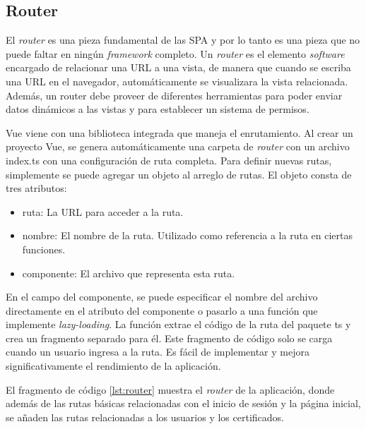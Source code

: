 \subsection{Router}
El \textit{router} es una pieza fundamental de las SPA y por lo tanto es una pieza que no puede faltar en ningún \textit{framework} completo. Un \textit{router} es el elemento \textit{software} encargado de relacionar una URL a una vista, de manera que cuando se escriba una URL en el navegador, automáticamente se visualizara la vista relacionada. Además, un router debe proveer de diferentes herramientas para poder enviar datos dinámicos a las vistas y para establecer un sistema de permisos.

Vue viene con una biblioteca integrada que maneja el enrutamiento. Al crear un proyecto Vue, se genera automáticamente una carpeta de \textit{router} con un archivo index.ts con una configuración de ruta completa. Para definir nuevas rutas, simplemente se puede agregar un objeto al arreglo de rutas. El objeto consta de tres atributos:

\begin{itemize}
\item ruta: La URL para acceder a la ruta.
\item nombre: El nombre de la ruta. Utilizado como referencia a la ruta en ciertas funciones.
\item componente: El archivo que representa esta ruta.
\end{itemize}

En el campo del componente, se puede especificar el nombre del archivo directamente en el atributo del componente o pasarlo a una función que implemente \textit{lazy-loading}. La función extrae el código de la ruta del paquete ts y crea un fragmento separado para él. Este fragmento de código solo se carga cuando un usuario ingresa a la ruta. Es fácil de implementar y mejora significativamente el rendimiento de la aplicación.

El fragmento de código \ref{lst:router} muestra el \textit{router} de la aplicación, donde además de las rutas básicas relacionadas con el inicio de sesión y la página inicial, se añaden las rutas relacionadas a los usuarios y los certificados.


